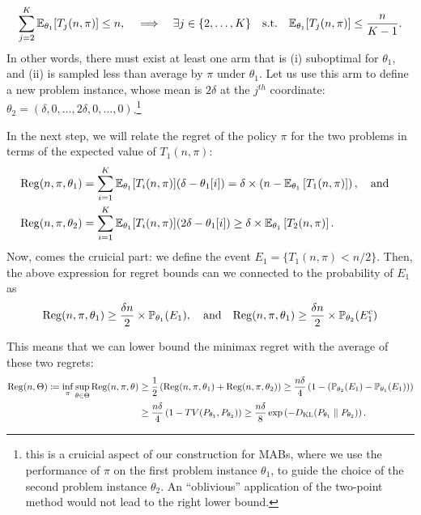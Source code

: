\documentclass[12pt]{article}
\begin{document}
\begin{align}
\sum_{j=2}^{K} \mathbb{E}_{\theta_1}[T_j(n, \pi)] \leq n, \quad \text{$\implies$} \quad \exists j \in \{2, \ldots, K\} \quad \text{s.t.} \quad \mathbb{E}_{\theta_1}[T_j(n, \pi)] \leq \frac{n}{K-1}. 
\end{align}
In other words, there must exist at least one arm that is (i) suboptimal for $\theta_1$, and (ii) is sampled less than average by $\pi$ under $\theta_1$. Let us use this arm to define a new problem instance, whose mean is $2\delta$ at the $j^{th}$ coordinate: $\theta_2 = (\delta, 0, \ldots, 2\delta, 0, \ldots, 0)$.\footnote{ this is a cruicial aspect of our construction for MABs, where we use the performance of $\pi$ on the first problem instance $\theta_1$, to guide the choice of the second problem instance $\theta_2$. An ``oblivious'' application of the two-point method would not lead to the right lower bound.} 

In the next step, we will relate the regret of the policy $\pi$ for the two problems in terms of the expected value of $T_1(n, \pi)$: 
\begin{align}
&\mathrm{Reg}(n, \pi, \theta_1) = \sum_{i=1}^K \mathbb{E}_{\theta_1}[T_i(n, \pi)] (\delta - \theta_1[i]) = \delta \times \left( n - \mathbb{E}_{\theta_1}\left[ T_1(n, \pi) \right]  \right), \quad \text{and} \quad  \\
&\mathrm{Reg}(n, \pi, \theta_2) = \sum_{i=1}^K \mathbb{E}_{\theta_1}[T_i(n, \pi)] (2\delta - \theta_1[i]) \geq \delta \times  \mathbb{E}_{\theta_1}\left[ T_2(n, \pi) \right].  
\end{align}
Now, comes the cruicial part: we define the event $E_1 = \{T_1(n, \pi) < n/2\}$. Then, the above expression for regret bounds can we connected to the probability of $E_1$ as 
\begin{align}
\mathrm{Reg}(n, \pi, \theta_1) \geq \frac{\delta n}{2} \times \mathbb{P}_{\theta_1}(E_1), \quad \text{and} \quad  
\mathrm{Reg}(n, \pi, \theta_1) \geq \frac{\delta n}{2} \times \mathbb{P}_{\theta_2}(E_1^c) \label{eq:mab-regret-lower-bound-1}
\end{align}

This means that we can lower bound the minimax regret with the average of these two regrets: 
\begin{align}
\mathrm{Reg}(n, \Theta) \coloneqq \inf_{\pi} \sup_{\theta \in \Theta} \mathrm{Reg}(n, \pi, \theta) &\geq \frac{1}{2}\left( \mathrm{Reg}(n, \pi, \theta_1) + \mathrm{Reg}(n, \pi, \theta_2) \right)  
\geq \frac{n \delta}{4}\left( 1 - \left( \mathbb{P}_{\theta_2}(E_1) - \mathbb{P}_{\theta_1}(E_1) \right) \right) \\
& \geq \frac{n \delta}{4}\left( 1 - TV(P_{\theta_1}, P_{\theta_2}) \right) 
\geq \frac{n \delta}{8} \exp \left( - D_{\text{KL}}(P_{\theta_1} \parallel P_{\theta_2}) \right). \label{eq:mab-regret-lower-bound-2}
\end{align}
\end{document}
